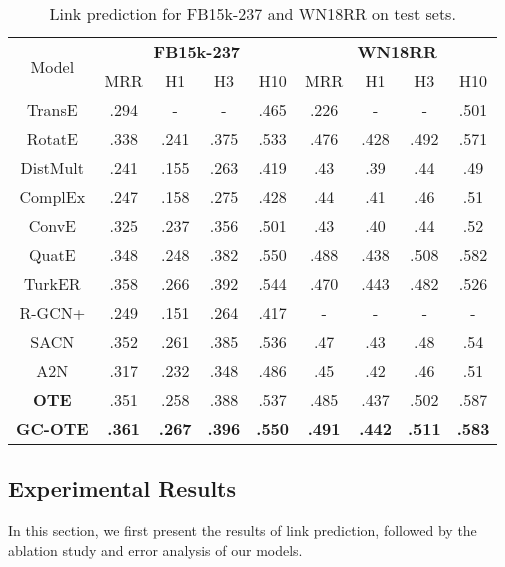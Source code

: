 \documentclass[11pt,a4paper]{article}
\begin{document}
\begin{table*}[!h]
\small
    \tabcolsep=0.32cm
    \centering
    \begin{tabular}{c|c|c|c|c|c|c|c|c}
        \hline
        \multirow{2}{*}{Model} & \multicolumn{4}{c|}{\textbf{FB15k-237}} & \multicolumn{4}{c}{\textbf{WN18RR}}\\
        \cline{2-9}
         & MRR & H1 & H3 & H10 & MRR  & H1 & H3 & H10   \\
        \hline
        \hline
        TransE  & .294 & - & - & .465  & .226 & - & - & .501  \\
        \hline
        RotatE  & .338 & .241 & .375 & .533 & .476 & .428 & .492 & .571  \\
        \hline
        \hline
        DistMult & .241 & .155 & .263 & .419 & .43 & .39 & .44 & .49 \\ 
        \hline
        ComplEx & .247 & .158 & .275 & .428  & .44 & .41 & .46 & .51\\
        \hline
        ConvE  & .325 & .237 & .356 & .501  & .43 & .40 & .44 & .52 \\
        \hline
        QuatE & .348 & .248 & .382 & .550 & .488 & .438 & .508 & .582 \\
        \hline
        TurkER & .358 & .266 & .392 & .544 & .470 & .443 & .482 & .526 \\
        \hline
        \hline
        R-GCN+ & .249 & .151 & .264 & .417 & - & - & -& -  \\
        \hline
        SACN  & .352 & .261 & .385 & .536 & .47  & .43 & .48 & .54  \\
        \hline
        A2N & .317 & .232 & .348 & .486  & .45 & .42 & .46 & .51 \\
        \hline
        \hline
        {\bf OTE}  & { .351}  & { .258}  & { .388} & { .537}  & { .485} & { .437} & { .502}  & { .587}  \\\hline
{\bf GC-OTE} & {\bf .361} & {\bf .267} & {\bf .396}  & {\bf .550} & {\bf .491} & {\bf .442} & {\bf .511}  & {\bf .583}  \\
\hline
    \end{tabular}
    \caption{Link prediction for FB15k-237 and WN18RR on test sets.}\label{tab:main_results}
\end{table*}

\subsection{Experimental Results}
In this section, we first present the results of link prediction, followed by the ablation study and error analysis of our models.
\end{document}
